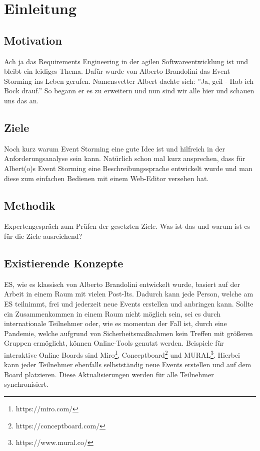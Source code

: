 \chapter{Einleitung}\label{ch:einleitung}

\section{Motivation}\label{sec:motivation}
Ach ja das Requirements Engineering in der agilen Softwareentwicklung ist
und bleibt ein leidiges Thema.
Dafür wurde von Alberto Brandolini das Event Storming ins Leben gerufen.
Namensvetter Albert dachte sich: ''Ja, geil - Hab ich Bock drauf.''
So begann er es zu erweitern und nun sind wir alle hier und schauen uns das an.

\section{Ziele}\label{sec:ziele}
Noch kurz warum Event Storming eine gute Idee ist und hilfreich in der
Anforderungsanalyse sein kann.
Natürlich schon mal kurz ansprechen, dass für Albert(o)s Event Storming eine
Beschreibungssprache entwickelt wurde und man diese zum einfachen Bedienen
mit einem Web-Editor versehen hat.

\section{Methodik}\label{sec:methodik}
Expertengespräch zum Prüfen der gesetzten Ziele.
Was ist das und warum ist es für die Ziele ausreichend?

\section{Existierende Konzepte}\label{sec:existierende-konzepte}
\ac{ES}, wie es klassisch von Alberto Brandolini entwickelt wurde, basiert auf der Arbeit in einem Raum mit vielen Post-Its.
Dadurch kann jede Person, welche am \ac{ES} teilnimmt, frei und jederzeit neue Events erstellen und anbringen kann.
Sollte ein Zusammenkommen in einem Raum nicht möglich sein, sei es durch internationale Teilnehmer oder, wie es momentan der Fall ist,
durch eine Pandemie, welche aufgrund von Sicherheitsmaßnahmen kein Treffen mit größeren Gruppen ermöglicht, können Online-Tools genutzt werden.
Beispiele für interaktive Online Boards sind Miro\footnote{https://miro.com/}, Conceptboard\footnote{https://conceptboard.com/} und MURAL\footnote{https://www.mural.co/}.
Hierbei kann jeder Teilnehmer ebenfalls selbstständig neue Events erstellen und auf dem Board platzieren.
Diese Aktualisierungen werden für alle Teilnehmer synchronisiert.

